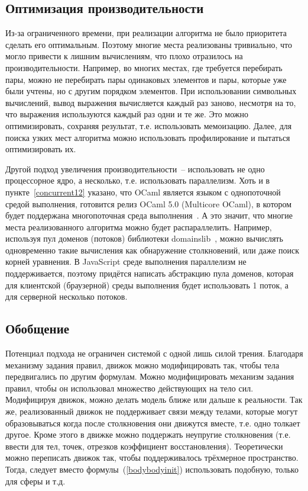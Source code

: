 \subsection{Оптимизация производительности}\label{optimization}

Из-за ограниченного времени, при реализации алгоритма не было приоритета сделать его оптимальным.
Поэтому многие места реализованы тривиально, что могло привести к лишним вычислениям, что плохо отразилось на производительности.
Например, во многих местах, где требуется перебирать пары,
можно не перебирать пары одинаковых элементов и пары, которые уже были учтены, но с другим порядком элементов.
При использовании символьных вычислений, вывод выражения вычисляется каждый раз заново, несмотря на то, что выражения используются каждый раз одни и те же.
Это можно оптимизировать, сохраняя результат, т.е. использовать мемоизацию.
Далее, для поиска узких мест алгоритма можно использовать профилирование и пытаться оптимизировать их.

Другой подход увеличения производительности~-- использовать не одно процессорное ядро, а несколько, т.е. использовать параллелизм.
Хоть и в пункте~\ref{concurrent12} указано, что OCaml является языком с однопоточной средой выполнения,
готовится релиз OCaml 5.0 (Multicore OCaml), в котором будет поддержана многопоточная среда выполнения~\cite{infoqmulticore}.
А это значит, что многие места реализованного алгоритма можно будет распараллелить.
Например, используя пул доменов (потоков) библиотеки domainslib~\cite{domainslibgithub},
можно вычислять одновременно такие вычисления как обнаружение столкновений, или даже поиск корней уравнения.
В JavaScript среде выполнения параллелизм не поддерживается, поэтому придётся написать абстракцию пула доменов,
которая для клиентской (браузерной) среды выполнения будет использовать 1 поток, а для серверной несколько потоков.

\subsection{Обобщение}

Потенциал подхода не ограничен системой с одной лишь силой трения.
Благодаря механизму задания правил, движок можно модифицировать так, чтобы тела передвигались по другим формулам.
Можно модифицировать механизм задания правил, чтобы он использовал множество действующих на тело сил.
Модифицируя движок, можно делать модель ближе или дальше к реальности.
Так же, реализованный движок не поддерживает связи между телами, которые
могут образовываться когда после столкновения они движутся вместе, т.е. одно толкает другое.
Кроме этого в движке можно поддержать неупругие столкновения (т.е. ввести для тел, точек, отрезков коэффициент восстановления).
Теоретически можно переписать движок так, чтобы поддерживалось трёхмерное пространство.
Тогда, следует вместо формулы~(\ref{bodybodyinit}) использовать подобную, только для сферы и т.д.



